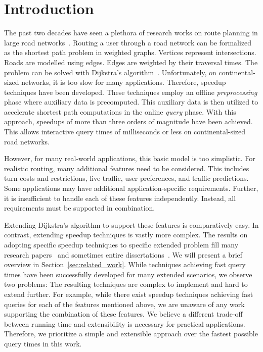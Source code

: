 \documentclass[manuscript,review]{acmart}
\begin{document}


\maketitle

\section{Introduction}
\label{sec:intro}
The past two decades have seen a plethora of research works on route planning in large road networks~\cite{bdgmpsww-rptn-16}.
Routing a user through a road network can be formalized as the shortest path problem in weighted graphs.
Vertices represent intersections.
Roads are modelled using edges.
Edges are weighted by their traversal times.
The problem can be solved with Dijkstra's algorithm~\cite{d-ntpcg-59}.
Unfortunately, on continental-sized networks, it is too slow for many applications.
Therefore, speedup techniques have been developed.
These techniques employ an offline \emph{preprocessing} phase where auxiliary data is precomputed.
This auxiliary data is then utilized to accelerate shortest path computations in the online \emph{query} phase.
With this approach, speedups of more than three orders of magnitude have been achieved.
This allows interactive query times of milliseconds or less on continental-sized road networks.

However, for many real-world applications, this basic model is too simplistic.
For realistic routing, many additional features need to be considered.
This includes turn costs and restrictions, live traffic, user preferences, and traffic predictions.
Some applications may have additional application-specific requirements.
Further, it is insufficient to handle each of these features independently.
Instead, all requirements must be supported in combination.

Extending Dijkstra's algorithm to support these features is comparatively easy.
In contrast, extending speedup techniques is vastly more complex.
The results on adopting specific speedup techniques to specific extended problem fill many research papers~\cite{gv-errnt-11,dgpw-crprn-13,dsw-cch-15,bwzz-cchtc-20,bgsv-mtdtt-13,swz-sfert-21} and sometimes entire dissertations~\cite{Delling2009_1000011046,b-tdrpc-14,Baum2018_1000082225}.
We will present a brief overview in Section~\ref{sec:related_work}.
While techniques achieving fast query times have been successfully developed for many extended scenarios, we observe two problems:
The resulting techniques are complex to implement and hard to extend further.
For example, while there exist speedup techniques achieving fast queries for each of the features mentioned above, we are unaware of any work supporting the combination of these features.
We believe a different trade-off between running time and extensibility is necessary for practical applications.
Therefore, we prioritize a simple and extensible approach over the fastest possible query times in this work.
\end{document}
